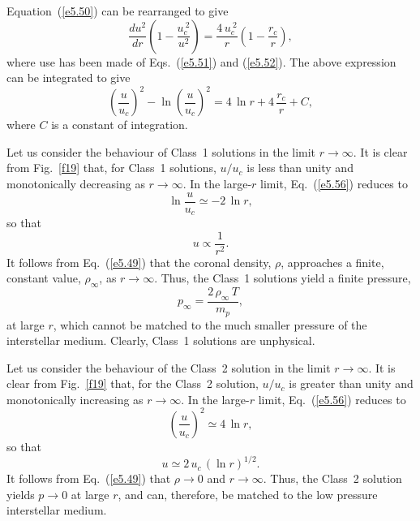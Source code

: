 Equation~(\ref{e5.50}) can be rearranged to give
\begin{equation}
\frac{du^2}{dr}\left(1-\frac{u_c^{~2}}{u^2}\right) = \frac{4\,u_c^{~2}}{r}
\left(1-\frac{r_c}{r}\right),
\end{equation}
where use has been made of Eqs.~(\ref{e5.51}) and (\ref{e5.52}). 
The above expression can be integrated to give
\begin{equation}\label{e5.56}
\left(\frac{u}{u_c}\right)^2 -\ln\!\left(\frac{u}{u_c}\right)^2 = 4\,\ln r
+ 4\,\frac{r_c}{r} + C,
\end{equation}
where $C$ is a constant of integration. 

Let us consider the behaviour
of Class~1 solutions in the limit $r\rightarrow\infty$. It is
clear from Fig.~\ref{f19} that, for Class~1 solutions, $u/u_c$ is less than unity and monotonically
decreasing as $r\rightarrow\infty$. In the large-$r$ limit, Eq.~(\ref{e5.56})
reduces to
\begin{equation}
\ln\frac{u}{u_c} \simeq -2\,\ln r,
\end{equation}
so that
\begin{equation}
u\propto \frac{1}{r^2}.
\end{equation}
It follows from Eq.~(\ref{e5.49}) that the coronal density, $\rho$, approaches
a finite, constant value, $\rho_\infty$, as $r\rightarrow\infty$. Thus,
the Class~1 solutions yield a finite pressure,
\begin{equation}
p_\infty= \frac{2\,\rho_\infty\,T}{m_p},
\end{equation}
at large $r$, which cannot be matched to the much smaller pressure of the
interstellar medium. Clearly, Class~1 solutions are unphysical.

Let us consider the behaviour of the Class~2 solution
in the limit $r\rightarrow\infty$. It is
clear from Fig.~\ref{f19} that, for the Class~2 solution, $u/u_c$ is greater than unity and monotonically
increasing as $r\rightarrow\infty$. In the large-$r$ limit,
Eq.~(\ref{e5.56}) reduces to
\begin{equation}
\left(\frac{u}{u_c}\right)^2 \simeq 4\,\ln r,
\end{equation}
so that
\begin{equation}
u \simeq 2\,u_c\,(\ln r)^{1/2}.
\end{equation}
It follows from Eq.~(\ref{e5.49}) that $\rho\rightarrow 0$ and 
$r\rightarrow\infty$. Thus, the Class~2 solution yields
$p\rightarrow 0$ at large $r$, and  can, therefore,  be matched to the low
pressure interstellar medium. 

